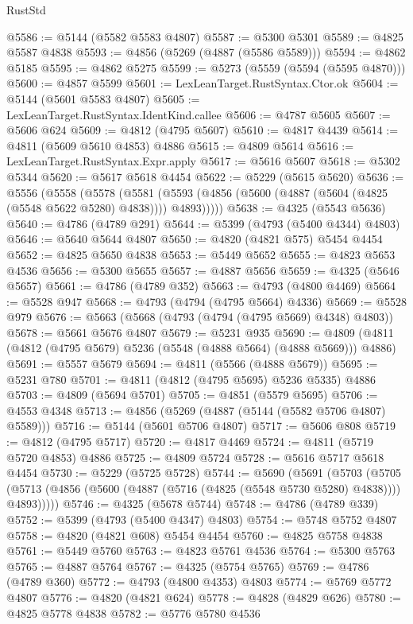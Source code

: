 \begin{lexlean}{RustStd}
\begin{coremodule}
{\begin{coremodule}
{{{{{{{{{{{{{{{{{{{{{{{{{{{{{{{{{{{{{{{{{{{{{{{{{{{{{{{{{{{{{{{{{{{{{{{{{{{{{{{{@5586 := @5144 (@5582 @5583 @4807)
@5587 := @5300 @5301
@5589 := @4825 @5587 @4838
@5593 := @4856 (@5269 (@4887 (@5586 @5589)))
@5594 := @4862 @5185
@5595 := @4862 @5275
@5599 := @5273 (@5559 (@5594 (@5595 @4870)))
@5600 := @4857 @5599
@5601 := LexLeanTarget.RustSyntax.Ctor.ok
@5604 := @5144 (@5601 @5583 @4807)
@5605 := LexLeanTarget.RustSyntax.IdentKind.callee
@5606 := @4787 @5605
@5607 := @5606 @624
@5609 := @4812 (@4795 @5607)
@5610 := @4817 @4439
@5614 := @4811 (@5609 @5610 @4853) @4886
@5615 := @4809 @5614
@5616 := LexLeanTarget.RustSyntax.Expr.apply
@5617 := @5616 @5607
@5618 := @5302 @5344
@5620 := @5617 @5618 @4454
@5622 := @5229 (@5615 @5620)
@5636 := @5556
    (@5558
      (@5578
        (@5581 (@5593 (@4856 (@5600 (@4887 (@5604 (@4825 (@5548 @5622 @5280) @4838)))) @4893)))))
@5638 := @4325 (@5543 @5636)
@5640 := @4786 (@4789 @291)
@5644 := @5399 (@4793 (@5400 @4344) @4803)
@5646 := @5640 @5644 @4807
@5650 := @4820 (@4821 @575) @5454 @4454
@5652 := @4825 @5650 @4838
@5653 := @5449 @5652
@5655 := @4823 @5653 @4536
@5656 := @5300 @5655
@5657 := @4887 @5656
@5659 := @4325 (@5646 @5657)
@5661 := @4786 (@4789 @352)
@5663 := @4793 (@4800 @4469)
@5664 := @5528 @947
@5668 := @4793 (@4794 (@4795 @5664) @4336)
@5669 := @5528 @979
@5676 := @5663 (@5668 (@4793 (@4794 (@4795 @5669) @4348) @4803))
@5678 := @5661 @5676 @4807
@5679 := @5231 @935
@5690 := @4809 (@4811 (@4812 (@4795 @5679) @5236 (@5548 (@4888 @5664) (@4888 @5669))) @4886)
@5691 := @5557 @5679
@5694 := @4811 (@5566 (@4888 @5679))
@5695 := @5231 @780
@5701 := @4811 (@4812 (@4795 @5695) @5236 @5335) @4886
@5703 := @4809 (@5694 @5701)
@5705 := @4851 (@5579 @5695)
@5706 := @4553 @4348
@5713 := @4856 (@5269 (@4887 (@5144 (@5582 @5706 @4807) @5589)))
@5716 := @5144 (@5601 @5706 @4807)
@5717 := @5606 @808
@5719 := @4812 (@4795 @5717)
@5720 := @4817 @4469
@5724 := @4811 (@5719 @5720 @4853) @4886
@5725 := @4809 @5724
@5728 := @5616 @5717 @5618 @4454
@5730 := @5229 (@5725 @5728)
@5744 := @5690
    (@5691
      (@5703
        (@5705 (@5713 (@4856 (@5600 (@4887 (@5716 (@4825 (@5548 @5730 @5280) @4838)))) @4893)))))
@5746 := @4325 (@5678 @5744)
@5748 := @4786 (@4789 @339)
@5752 := @5399 (@4793 (@5400 @4347) @4803)
@5754 := @5748 @5752 @4807
@5758 := @4820 (@4821 @608) @5454 @4454
@5760 := @4825 @5758 @4838
@5761 := @5449 @5760
@5763 := @4823 @5761 @4536
@5764 := @5300 @5763
@5765 := @4887 @5764
@5767 := @4325 (@5754 @5765)
@5769 := @4786 (@4789 @360)
@5772 := @4793 (@4800 @4353) @4803
@5774 := @5769 @5772 @4807
@5776 := @4820 (@4821 @624)
@5778 := @4828 (@4829 @626)
@5780 := @4825 @5778 @4838
@5782 := @5776 @5780 @4536
}}}}}}}}}}}}}}}}}}}}}}}}}}}}}}}}}}}}}}}}}}}}}}}}}}}}}}}}}}}}}}}}}}}}}}}}}}}}}}}}
\end{coremodule}}
\end{coremodule}
\end{lexlean}
